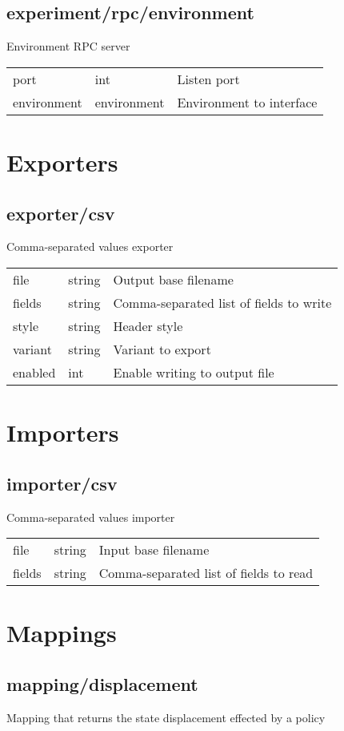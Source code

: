 \subsection{experiment/rpc/environment}
\noindent Environment RPC server\\

\noindent\begin{tabular}{@{}lll@{}}
port&int&Listen port\\
environment&environment&Environment to interface\\
\end{tabular}
\section{Exporters}
\subsection{exporter/csv}
\noindent Comma-separated values exporter\\

\noindent\begin{tabular}{@{}lll@{}}
file&string&Output base filename\\
fields&string&Comma-separated list of fields to write\\
style&string&Header style\\
variant&string&Variant to export\\
enabled&int&Enable writing to output file\\
\end{tabular}
\section{Importers}
\subsection{importer/csv}
\noindent Comma-separated values importer\\

\noindent\begin{tabular}{@{}lll@{}}
file&string&Input base filename\\
fields&string&Comma-separated list of fields to read\\
\end{tabular}
\section{Mappings}
\subsection{mapping/displacement}
\noindent Mapping that returns the state displacement effected by a policy\\


